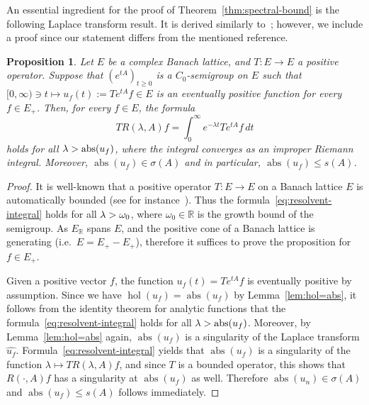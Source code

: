 \documentclass[a4paper, reqno]{amsart}
\numberwithin{equation}{section}
\theoremstyle{plain}
\newtheorem{proposition}[theorem]{Proposition}
\theoremstyle{definition}
\theoremstyle{remark}
\DeclareMathOperator{\abs}{abs}
\DeclareMathOperator{\hol}{hol}
\let\Re\relax
\DeclareMathOperator{\Re}{Re}
\newcommand{\RR}{\mathbb{R}}
\begin{document}
An essential ingredient for the proof of Theorem~\ref{thm:spectral-bound} is the following Laplace transform result. It is derived similarly to~\cite[Proposition 6.1]{Ar21}; however, we include a proof since our statement differs from the mentioned reference.
\begin{proposition}
	\label{prop:hol=abs}
	Let $E$ be a complex Banach lattice, and $T:E\to E$ a positive operator. Suppose that $(e^{tA})_{t\ge 0}$ is a $C_0$-semigroup on $E$ such that $[0,\infty) \ni t \mapsto u_f(t):=Te^{tA}f\in E$ is an eventually positive function for every $f\in E_+$. Then, for every $f\in E$, the formula
	\begin{equation}
		\label{eq:resolvent-integral}
		T R(\lambda,A)f = \int_0^\infty e^{-\lambda t}Te^{tA}f\,dt
	\end{equation}
	holds for all $\Re\lambda>\abs(u_f)$, where the integral converges as an improper Riemann integral. Moreover, $\abs(u_f)\in\sigma(A)$ and in particular, $\abs(u_f)\le s(A)$.
\end{proposition}
\begin{proof}
	It is well-known that a positive operator $T:E\to E$ on a Banach lattice $E$ is automatically bounded (see for instance~\cite[Theorem 4.3]{AB}). Thus the formula~\eqref{eq:resolvent-integral} holds for all $\Re\lambda>\omega_0$, where $\omega_0\in\RR$ is the growth bound of the semigroup. As $E_\RR$ spans $E$, and the positive cone of a Banach lattice is generating (i.e.\ $E=E_+-E_+$), therefore it suffices to prove the proposition for $f\in E_+$. 
	
	Given a positive vector $f$, the function $u_f(t)=Te^{tA}f$ is eventually positive by assumption. Since we have $\hol(u_f)=\abs(u_f)$ by Lemma~\ref{lem:hol=abs}, it follows from the identity theorem for analytic functions that the formula~\eqref{eq:resolvent-integral} holds for all $\Re\lambda>\abs(u_f)$. Moreover, by Lemma~\ref{lem:hol=abs} again, $\abs(u_f)$ is a singularity of the Laplace transform $\widehat{u_f}$. Formula~\eqref{eq:resolvent-integral} yields that $\abs(u_f)$ is a singularity of the function $\lambda\mapsto TR(\lambda,A)f$, and since $T$ is a bounded operator, this shows that $R(\cdot,A)f$ has a singularity at $\abs(u_f)$ as well. Therefore $\abs(u_n)\in\sigma(A)$ and $\abs(u_f)\le s(A)$ follows immediately.
\end{proof}
\end{document}
